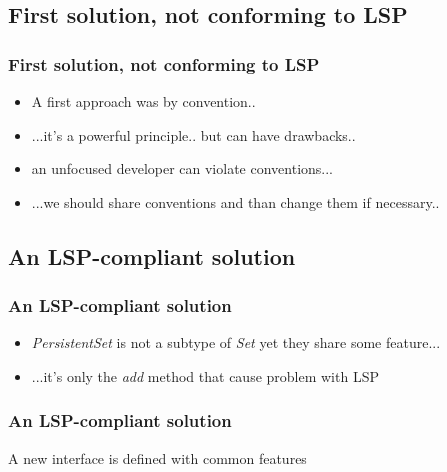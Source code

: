 \documentclass{beamer}
\begin{document}
\subsection{First solution, not conforming to LSP}
\begin{frame}
  \frametitle{First solution, not conforming to LSP}
	\begin{itemize}
	\item<+-> A first approach was by convention..   
	\item<+-> ...it's a powerful principle.. but can have drawbacks..
	\item<+-> an unfocused developer can violate conventions...
	\item<+-> ...we should share conventions and than change them if necessary..
   \end{itemize}
\end{frame}

\subsection{An LSP-compliant solution}
\begin{frame}
  \frametitle{An LSP-compliant solution}
	\begin{itemize}
	\item<+-> \textit{PersistentSet} is not a subtype of \textit{Set} yet they share some feature...
	\item<+-> ...it's only the \textit{add} method that cause problem with LSP
   \end{itemize}
\end{frame}

\begin{frame}
  \frametitle{An LSP-compliant solution}
	A new interface is defined with common features \\
	\begin{center}
	\end{center}
\end{frame}
\end{document}
